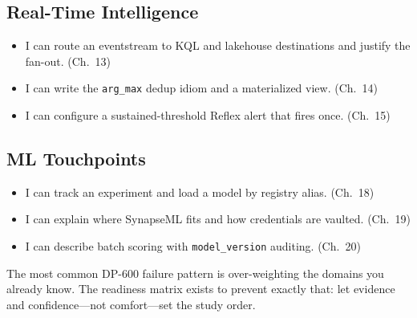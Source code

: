 \subsection*{Real-Time Intelligence}
\begin{itemize}
    \item[$\square$] I can route an eventstream to KQL and lakehouse destinations and justify
    the fan-out. (Ch.~13)
    \item[$\square$] I can write the \texttt{arg\_max} dedup idiom and a materialized view. (Ch.~14)
    \item[$\square$] I can configure a sustained-threshold Reflex alert that fires once. (Ch.~15)
\end{itemize}

\subsection*{ML Touchpoints}
\begin{itemize}
    \item[$\square$] I can track an experiment and load a model by registry alias. (Ch.~18)
    \item[$\square$] I can explain where SynapseML fits and how credentials are vaulted. (Ch.~19)
    \item[$\square$] I can describe batch scoring with \texttt{model\_version} auditing. (Ch.~20)
\end{itemize}

\begin{pitfall}
The most common DP-600 failure pattern is over-weighting the domains you already know. The
readiness matrix exists to prevent exactly that: let evidence and confidence---not
comfort---set the study order.
\end{pitfall}
